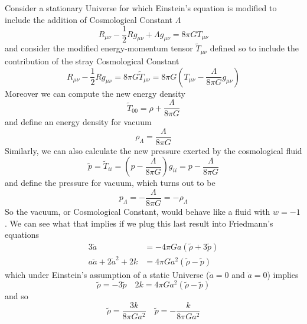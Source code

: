 Consider a stationary Universe for which Einstein's equation is modified to include the addition of Cosmological Constant $\Lambda$
\begin{equation}
    R_{\mu\nu} - \frac{1}{2}Rg_{\mu\nu} + \Lambda g_{\mu\nu} = 8\pi G T_{\mu\nu}
\end{equation}
and consider the modified energy-momentum tensor $\tilde{T}_{\mu\nu}$ defined so to include the contribution of the stray Cosmological Constant
\begin{equation}
    R_{\mu\nu} - \frac{1}{2}Rg_{\mu\nu} = 8\pi G \tilde{T}_{\mu\nu} = 8\pi G\left(T_{\mu\nu}-\frac{\Lambda}{8\pi G}g_{\mu\nu}\right)
\end{equation}
Moreover we can compute the new energy density
\begin{equation}
    \tilde{T}_{00} = \rho + \frac{\Lambda}{8\pi G}
\end{equation}
and define an energy density for vacuum
\begin{equation}
    \rho_{\Lambda} =  \frac{\Lambda}{8\pi G}
    \label{eq:vacuum_ed}
\end{equation}
Similarly, we can also calculate the new pressure exerted by the cosmological fluid
\begin{equation}
    \tilde{p} = \tilde{T}_{ii} = \left(p - \frac{\Lambda}{8\pi G}\right)g_{ii} = p - \frac{\Lambda}{8\pi G}
\end{equation}
and define the pressure for vacuum, which turns out to be 
\begin{equation}
    p_{\Lambda} =  -\frac{\Lambda}{8\pi G} = -\rho_{\Lambda}
    \label{eq:vacuum_p}
\end{equation}
So the vacuum, or Cosmological Constant, would behave like a fluid with $w = -1$. We can see what that implies if we plug this last result into Friedmann's equations
\begin{align*}
    3\ddot{a} &= -4\pi Ga(\tilde{\rho}+3\tilde{p})\\
    a\ddot{a} + 2\dot{a}^{2} + 2k &= 4\pi G a^{2}(\tilde{\rho}-\tilde{p})
\end{align*}
which under Einstein's assumption of a static Universe ($\dot{a} = 0$ and $ \ddot{a} = 0$) implies 
\begin{equation}
    \tilde{\rho} = -3\tilde{p} \quad 2k = 4\pi G a^{2}(\tilde{\rho}-\tilde{p})
\end{equation}
and so
\begin{equation}
    \tilde{\rho} = \frac{3k}{8\pi G a^{2}} \quad \tilde{p} = -\frac{k}{8\pi G a^{2}}
\end{equation}
